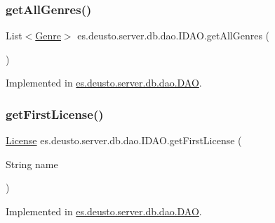 \subsubsection{\texorpdfstring{get\+All\+Genres()}{getAllGenres()}}
{\footnotesize\ttfamily List$<$\hyperlink{classes_1_1deusto_1_1server_1_1db_1_1data_1_1_genre}{Genre}$>$ es.\+deusto.\+server.\+db.\+dao.\+I\+D\+A\+O.\+get\+All\+Genres (\begin{DoxyParamCaption}{ }\end{DoxyParamCaption})}



Implemented in \hyperlink{classes_1_1deusto_1_1server_1_1db_1_1dao_1_1_d_a_o_ac1cb7032ef21f53dead8347ef440f431}{es.\+deusto.\+server.\+db.\+dao.\+D\+AO}.

\mbox{\label{interfacees_1_1deusto_1_1server_1_1db_1_1dao_1_1_i_d_a_o_aef2783889a572e23bd57c5a2a955599a}} 
\subsubsection{\texorpdfstring{get\+First\+License()}{getFirstLicense()}}
{\footnotesize\ttfamily \hyperlink{classes_1_1deusto_1_1server_1_1db_1_1data_1_1_license}{License} es.\+deusto.\+server.\+db.\+dao.\+I\+D\+A\+O.\+get\+First\+License (\begin{DoxyParamCaption}\item[{String}]{name }\end{DoxyParamCaption})}



Implemented in \hyperlink{classes_1_1deusto_1_1server_1_1db_1_1dao_1_1_d_a_o_a4a5a54059bac00ea6f3b6d21f2a31a02}{es.\+deusto.\+server.\+db.\+dao.\+D\+AO}.

\mbox{\label{interfacees_1_1deusto_1_1server_1_1db_1_1dao_1_1_i_d_a_o_ad6fd7873e2191e887184e2261e34e3e5}} 
